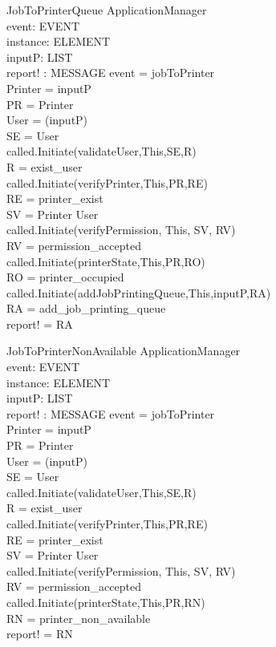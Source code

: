 \begin{schema}{JobToPrinterQueue}
\Delta ApplicationManager \\
event: EVENT \\
instance: ELEMENT \\
inputP: LIST \\
report! : MESSAGE
\where event = jobToPrinter \\
Printer = \head inputP \\
PR = \lseq Printer \rseq \\
User = \head (\tail inputP) \\
SE = \lseq User \rseq \\
called.Initiate(validateUser,This,SE,R) \\
R = exist\_user \\
called.Initiate(verifyPrinter,This,PR,RE) \\
RE = printer\_exist \\

SV = \lseq Printer User \rseq \\
called.Initiate(verifyPermission, This, SV, RV) \\
RV = permission\_accepted \\

called.Initiate(printerState,This,PR,RO) \\
RO = printer\_occupied \\

called.Initiate(addJobPrintingQueue,This,inputP,RA) \\
RA = add\_job\_printing\_queue \\
report! = RA
\end{schema}

\begin{schema}{JobToPrinterNonAvailable}
\Delta ApplicationManager \\
event: EVENT \\
instance: ELEMENT \\
inputP: LIST \\
report! : MESSAGE
\where event = jobToPrinter \\
Printer = \head inputP \\
PR = \lseq Printer \rseq \\
User = \head (\tail inputP) \\
SE = \lseq User \rseq \\
called.Initiate(validateUser,This,SE,R) \\
R = exist\_user \\
called.Initiate(verifyPrinter,This,PR,RE) \\
RE = printer\_exist \\

SV = \lseq Printer User \rseq \\
called.Initiate(verifyPermission, This, SV, RV) \\
RV = permission\_accepted \\

called.Initiate(printerState,This,PR,RN) \\
RN = printer\_non\_available \\

report! = RN
\end{schema}

